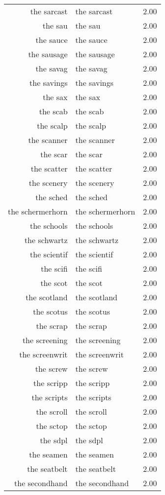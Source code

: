 \begin{table}[ht]
\begin{tabular}{rlr}
  the sarcast & the sarcast & 2.00 \\ 
  the sau & the sau & 2.00 \\ 
  the sauce & the sauce & 2.00 \\ 
  the sausage & the sausage & 2.00 \\ 
  the savag & the savag & 2.00 \\ 
  the savings & the savings & 2.00 \\ 
  the sax & the sax & 2.00 \\ 
  the scab & the scab & 2.00 \\ 
  the scalp & the scalp & 2.00 \\ 
  the scanner & the scanner & 2.00 \\ 
  the scar & the scar & 2.00 \\ 
  the scatter & the scatter & 2.00 \\ 
  the scenery & the scenery & 2.00 \\ 
  the sched & the sched & 2.00 \\ 
  the schermerhorn & the schermerhorn & 2.00 \\ 
  the schools & the schools & 2.00 \\ 
  the schwartz & the schwartz & 2.00 \\ 
  the scientif & the scientif & 2.00 \\ 
  the scifi & the scifi & 2.00 \\ 
  the scot & the scot & 2.00 \\ 
  the scotland & the scotland & 2.00 \\ 
  the scotus & the scotus & 2.00 \\ 
  the scrap & the scrap & 2.00 \\ 
  the screening & the screening & 2.00 \\ 
  the screenwrit & the screenwrit & 2.00 \\ 
  the screw & the screw & 2.00 \\ 
  the scripp & the scripp & 2.00 \\ 
  the scripts & the scripts & 2.00 \\ 
  the scroll & the scroll & 2.00 \\ 
  the sctop & the sctop & 2.00 \\ 
  the sdpl & the sdpl & 2.00 \\ 
  the seamen & the seamen & 2.00 \\ 
  the seatbelt & the seatbelt & 2.00 \\ 
  the secondhand & the secondhand & 2.00 \\ 

\end{tabular}
\end{table}
